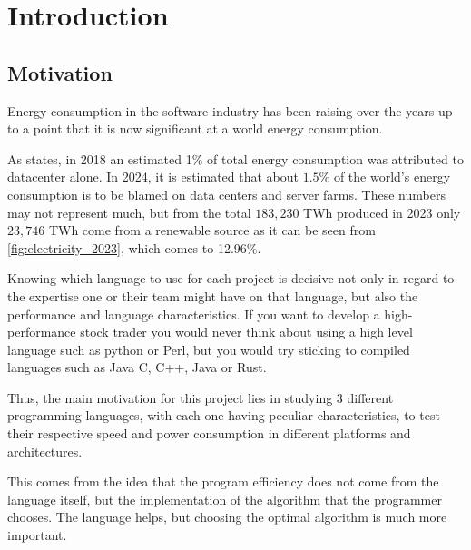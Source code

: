 \chapter{Introduction}\label{chap:introduction}



\section{Motivation}\label{sec:motivation}
Energy consumption in the software industry has been raising over the years up to a point that it is now significant at a world energy consumption. %

As \cite{recalibrating-datacenter} states, in 2018 an estimated 1\% of total energy consumption was attributed to datacenter alone. In 2024, it is estimated that about $1.5\%$ of the world's energy consumption is to be blamed on data centers and server farms. These numbers may not represent much, but from the total $183,230$ TWh produced in 2023 \cite{energy-production-consumption} only $23,746$ TWh come from a renewable source as it can be seen from \autoref{fig:electricity_2023}, which comes to 12.96\%.

Knowing which language to use for each project is decisive not only in regard to the expertise one or their team might have on that language, but also the performance and language characteristics. If you want to develop a high-performance stock trader you would never think about using a high level language such as python or Perl, but you would try sticking to compiled languages such as Java C, C++, Java or Rust. 

Thus, the main motivation for this project lies in studying 3 different programming languages, with each one having peculiar characteristics, to test their respective speed and power consumption in different platforms and architectures. 

This comes from the idea that the program efficiency does not come from the language itself, but the implementation of the algorithm that the programmer chooses. The language helps, but choosing the optimal algorithm is much more important.

